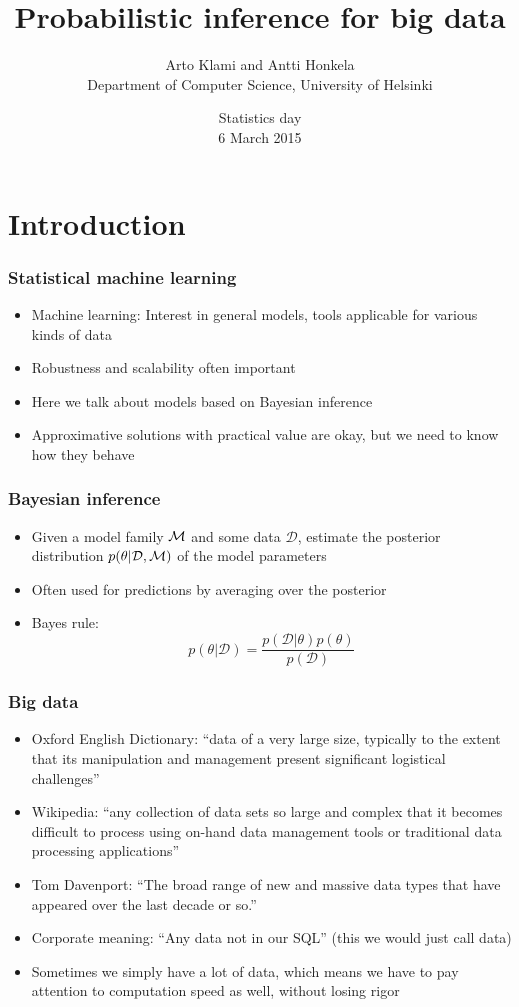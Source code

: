 \documentclass{beamer}
\title{Probabilistic inference for big data}
\author{Arto Klami and Antti Honkela\\
Department of Computer Science, University of Helsinki}
\date{Statistics day\\6 March 2015}
\newcommand{\dataset}{\mathcal{D}}
\newcommand{\parameters}{\theta}
\begin{document}
\frame{\titlepage}


\section{Introduction}

\begin{frame}
  \frametitle{Statistical machine learning}

  \begin{itemize}
  \item Machine learning: Interest in general models, tools applicable
    for various kinds of data
  \item Robustness and scalability often important
  \item Here we talk about models based on Bayesian inference
  \item Approximative solutions with practical value are okay, but
    we need to know how they behave
  \end{itemize}
\end{frame}

\begin{frame}
  \frametitle{Bayesian inference}

  \begin{itemize}
  \item Given a model family ${\cal M}$ and some data $\dataset$, estimate
    the posterior distribution $p(\parameters|\dataset,{\cal M})$ of the model
    parameters
  \item Often used for predictions by averaging over the posterior
  \item Bayes rule:
    \[
    p(\parameters|\dataset) = \frac{p(\dataset|\parameters)p(\parameters)}{p(\dataset)}
    \]
  \end{itemize}
\end{frame}

\begin{frame}
  \frametitle{Big data}

  \begin{itemize}
  \item Oxford English Dictionary: ``data of a very large size, typically to the extent that its manipulation and management present significant logistical challenges''
  \item Wikipedia: ``any collection of data sets so large and complex that it becomes difficult to process using on-hand data management tools or traditional data processing applications''
  \item Tom Davenport: ``The broad range of new and massive data types that have appeared over the last decade or so.''
  \item Corporate meaning: ``Any data not in our SQL'' (this we would just call data)
  \end{itemize}

  \begin{itemize}
  \item Sometimes we simply have a lot of data, which means we
    have to pay attention to computation speed as well, without losing
    rigor
  \end{itemize}
\end{frame}
\end{document}
